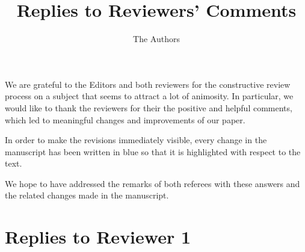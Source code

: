 \documentclass[11pt, executivepaper]{article}
\begin{document}
\title{\textbf{Replies to Reviewers' Comments}}

\author{The Authors}

\maketitle


\noindent We are grateful to the Editors and both reviewers for the constructive review process on a subject that seems to attract a lot of animosity. In particular, we would like to thank the reviewers for their the positive and helpful comments, which led to meaningful changes and improvements of our paper.
\vspace{2mm}

In order to make the revisions immediately visible, every change in the manuscript has been written in blue so that it is highlighted with respect to the text.
\vspace{2mm}

We hope to have addressed the remarks of both referees with these answers and the related changes made in the manuscript.

\section{Replies to Reviewer 1}
\end{document}
